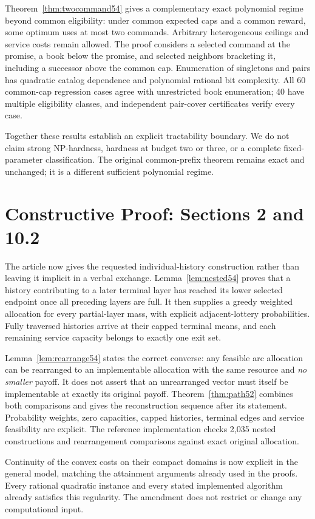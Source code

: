 Theorem~\ref{thm:twocommand54} gives a complementary exact polynomial regime beyond common eligibility: under common expected caps and a common reward, some optimum uses at most two commands. Arbitrary heterogeneous ceilings and service costs remain allowed. The proof considers a selected command at the promise, a book below the promise, and selected neighbors bracketing it, including a successor above the common cap. Enumeration of singletons and pairs has quadratic catalog dependence and polynomial rational bit complexity. All 60 common-cap regression cases agree with unrestricted book enumeration; 40 have multiple eligibility classes, and independent pair-cover certificates verify every case.

Together these results establish an explicit tractability boundary. We do not claim strong NP-hardness, hardness at budget two or three, or a complete fixed-parameter classification. The original common-prefix theorem remains exact and unchanged; it is a different sufficient polynomial regime.

\section{Constructive Proof: Sections 2 and 10.2}
The article now gives the requested individual-history construction rather than leaving it implicit in a verbal exchange. Lemma~\ref{lem:nested54} proves that a history contributing to a later terminal layer has reached its lower selected endpoint once all preceding layers are full. It then supplies a greedy weighted allocation for every partial-layer mass, with explicit adjacent-lottery probabilities. Fully traversed histories arrive at their capped terminal means, and each remaining service capacity belongs to exactly one exit set.

Lemma~\ref{lem:rearrange54} states the correct converse: any feasible arc allocation can be rearranged to an implementable allocation with the same resource and \emph{no smaller} payoff. It does not assert that an unrearranged vector must itself be implementable at exactly its original payoff. Theorem~\ref{thm:path52} combines both comparisons and gives the reconstruction sequence after its statement. Probability weights, zero capacities, capped histories, terminal edges and service feasibility are explicit. The reference implementation checks 2,035 nested constructions and rearrangement comparisons against exact original allocation.

Continuity of the convex costs on their compact domains is now explicit in the general model, matching the attainment arguments already used in the proofs. Every rational quadratic instance and every stated implemented algorithm already satisfies this regularity. The amendment does not restrict or change any computational input.

